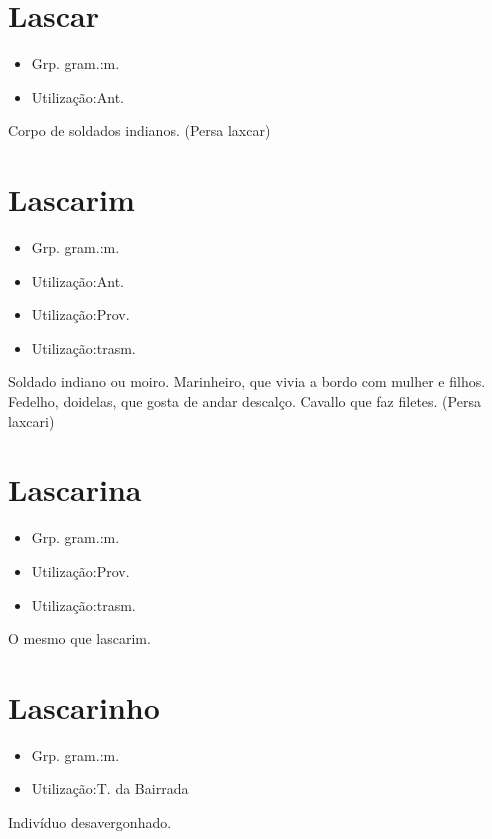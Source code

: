 \section{Lascar}
\begin{itemize}
\item {Grp. gram.:m.}
\end{itemize}
\begin{itemize}
\item {Utilização:Ant.}
\end{itemize}
Corpo de soldados indianos.
(Persa \textunderscore laxcar\textunderscore )
\section{Lascarim}
\begin{itemize}
\item {Grp. gram.:m.}
\end{itemize}
\begin{itemize}
\item {Utilização:Ant.}
\end{itemize}
\begin{itemize}
\item {Utilização:Prov.}
\end{itemize}
\begin{itemize}
\item {Utilização:trasm.}
\end{itemize}
Soldado indiano ou moiro.
Marinheiro, que vivia a bordo com mulher e filhos.
Fedelho, doidelas, que gosta de andar descalço.
Cavallo que faz filetes.
(Persa \textunderscore laxcari\textunderscore )
\section{Lascarina}
\begin{itemize}
\item {Grp. gram.:m.}
\end{itemize}
\begin{itemize}
\item {Utilização:Prov.}
\end{itemize}
\begin{itemize}
\item {Utilização:trasm.}
\end{itemize}
O mesmo que \textunderscore lascarim\textunderscore .
\section{Lascarinho}
\begin{itemize}
\item {Grp. gram.:m.}
\end{itemize}
\begin{itemize}
\item {Utilização:T. da Bairrada}
\end{itemize}
Indivíduo desavergonhado.
